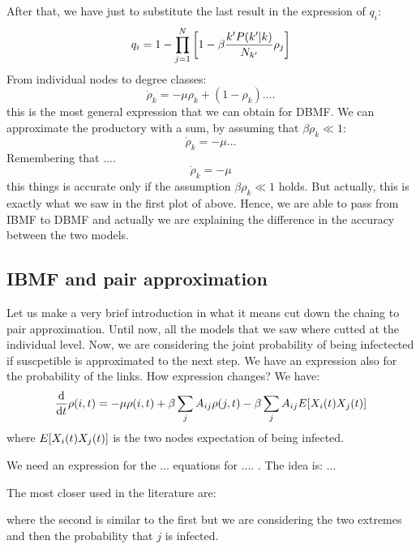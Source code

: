 \documentclass[../main/main.tex]{subfiles}
\begin{document}
After that, we have just to substitute the last result in the expression of \( q_i \):
\begin{equation*}
  q_i = 1 - \prod_{j=1}^{N} \qty[1 - \beta \frac{k' P(k'|k)}{N_{k'}} \rho _j]
\end{equation*}
From individual nodes to degree classes:
\begin{equation*}
  \dot{\rho }_k = - \mu \rho _k + (1- \rho _k)....
\end{equation*}
this is the most general expression that we can obtain for DBMF.
We can approximate the productory with a sum, by assuming that \( \beta \rho _k \ll 1 \):
\begin{equation*}
  \dot{\rho }_ k = - \mu ...
\end{equation*}
Remembering that ....
\begin{equation*}
   \dot{\rho }_ k = - \mu
\end{equation*}
this things is accurate only if the assumption \( \beta \rho _k \ll 1 \) holds. But actually, this is exactly what we saw in the first plot of above. Hence, we are able to pass from IBMF to DBMF and actually we are explaining the difference in the accuracy between the two models.

\subsection{IBMF and pair approximation}
 Let us make a very brief introduction in what it means cut down the chaing to pair approximation.
 Until now, all the models that we saw where cutted at the individual level. Now, we are considering the joint probability of being infectected if suscpetible is approximated to the next step. We have an expression also for the probability of the links.
How expression changes?
We have:
\begin{equation*}
  \dv{}{t} \rho (i,t) = - \mu \rho (i,t) + \beta \sum_{j}^{} A_{ij} \rho (j,t) - \beta \sum_{j}^{} A_{ij} E \qty[X_i (t) X_j (t)]
\end{equation*}
where \(  E \qty[X_i (t) X_j (t)] \) is the two nodes expectation of being infected.

We need an expression for the ... equations for .... .
The idea is:
...

The most closer used in the literature are:

where the second is similar to the first but we are considering the two extremes and then the probability that \( j \) is infected.
\end{document}
